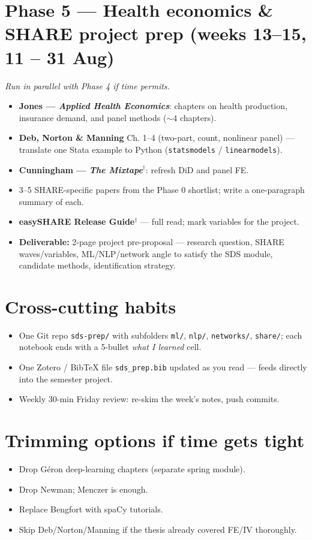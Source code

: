 \documentclass[11pt,a4paper]{article}
\begin{document}
\section{Phase 5 --- Health economics \& SHARE project prep (weeks 13--15, 11 -- 31 Aug)}
\textit{Run in parallel with Phase 4 if time permits.}
\begin{itemize}
  \item \textbf{Jones --- \textit{Applied Health Economics}}: chapters on health production, insurance demand, and panel methods ($\sim$4 chapters).
  \item \textbf{Deb, Norton \& Manning} Ch. 1--4 (two-part, count, nonlinear panel) --- translate one Stata example to Python (\texttt{statsmodels} / \texttt{linearmodels}).
  \item \textbf{Cunningham --- \textit{The Mixtape}}$^\dagger$: refresh DiD and panel FE.
  \item 3--5 SHARE-specific papers from the Phase 0 shortlist; write a one-paragraph summary of each.
  \item \textbf{easySHARE Release Guide}$^\dagger$ --- full read; mark variables for the project.
  \item \textbf{Deliverable:} 2-page project pre-proposal --- research question, SHARE waves/variables, ML/NLP/network angle to satisfy the SDS module, candidate methods, identification strategy.
\end{itemize}

\section{Cross-cutting habits}
\begin{itemize}
  \item One Git repo \texttt{sds-prep/} with subfolders \texttt{ml/}, \texttt{nlp/}, \texttt{networks/}, \texttt{share/}; each notebook ends with a 5-bullet \textit{what I learned} cell.
  \item One Zotero / BibTeX file \texttt{sds\_prep.bib} updated as you read --- feeds directly into the semester project.
  \item Weekly 30-min Friday review: re-skim the week's notes, push commits.
\end{itemize}

\section{Trimming options if time gets tight}
\begin{itemize}
  \item Drop G\'eron deep-learning chapters (separate spring module).
  \item Drop Newman; Menczer is enough.
  \item Replace Bengfort with spaCy tutorials.
  \item Skip Deb/Norton/Manning if the thesis already covered FE/IV thoroughly.
\end{itemize}
\end{document}
